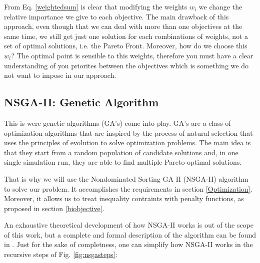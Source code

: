 \documentclass[a4paper,11pt, titlepage, twoside]{article}
\begin{document}
From Eq. \ref{weightedsum} is clear that modifying the weights $w_i$ we change the relative importance we give to each objective. The main drawback of this approach, even though that we can deal with more than one objectives at the same time, we
still get just one solution for each combinations of weights, not a set of optimal solutions, i.e. the Pareto Front. Moreover, how do we choose this $w_i$? The optimal point is sensible to this weights, therefore you must have
a clear understanding of you priorites between the objectives which is something we do not want to impose in our approach.\par

\subsection{NSGA-II: Genetic Algorithm}\label{NSGAII}



This is were genetic algorithms (GA's) come into play. GA's are a class of optimization algorithms that are inspired by the process of natural selection that uses the principles of evolution to solve optimization problems. The main idea is that they start from a random
population of candidate solutions and, in one single simulation run, they are able to find multiple Pareto optimal solutions. \par

That is why we will use the Nondominated Sorting GA II (NSGA-II) algorithm to solve our problem. It accomplishes the requirements in  section \ref{Optimization}.
Moreover, it allows us to treat inequality contraints with penalty functions, as proposed in section \ref{biobjective}.\par

An exhaustive theoretical development of how NSGA-II works is out of the scope of this work, but a complete and formal description of the algorithm can be found in \cite{NSGAII}. Just for the sake of completness, one can simplify how NSGA-II works in the recursive steps of Fig. \ref{fig:nsgasteps}:
\end{document}
